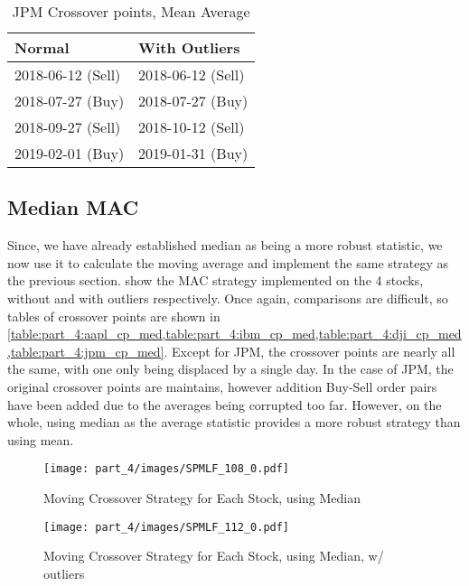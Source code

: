 \begin{table}[!htb]
    \centering
    \begin{tabular}{l|l}
    Normal            & With Outliers     \\ \hline
    2018-06-12 (Sell) & 2018-06-12 (Sell) \\
    2018-07-27 (Buy)  & 2018-07-27 (Buy)  \\
    2018-09-27 (Sell) & 2018-10-12 (Sell) \\
    2019-02-01 (Buy)  & 2019-01-31 (Buy)  

    \end{tabular}
    \caption{JPM Crossover points, Mean Average}
    \label{table:part_4:jpm_cp_mean}
\end{table}

\subsection{Median MAC}

Since, we have already established median as being a more robust statistic, we now use it to calculate the moving average and implement the same strategy as the previous section.  show the MAC strategy implemented on the 4 stocks, without and with outliers respectively. Once again, comparisons are difficult, so tables of crossover points are shown in \cref{table:part_4:aapl_cp_med,table:part_4:ibm_cp_med,table:part_4:dji_cp_med,table:part_4:jpm_cp_med}. Except for JPM, the crossover points are nearly all the same, with one only being displaced by a single day. In the case of JPM, the original crossover points are maintains, however addition Buy-Sell order pairs have been added due to the averages being corrupted too far. However, on the whole, using median as the average statistic provides a more robust strategy than using mean.

\begin{figure}[!htb]
    \centering
    \texttt{[image: part\_4/images/SPMLF\_108\_0.pdf]}
    \caption{Moving Crossover Strategy for Each Stock, using Median}
    \label{fig:part_4:mac_median}
\end{figure}

\begin{figure}[!htb]
    \centering
    \texttt{[image: part\_4/images/SPMLF\_112\_0.pdf]}
    \caption{Moving Crossover Strategy for Each Stock, using Median, w/ outliers}
    \label{fig:part_4:mac_median_out}
\end{figure}


